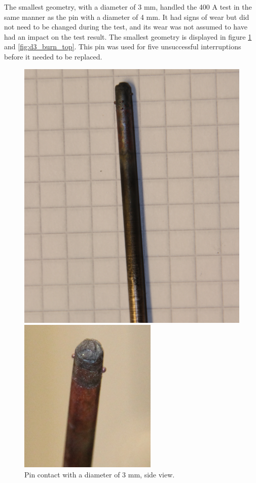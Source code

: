 \documentclass[10pt,a4paper,twoside]{article}
\begin{document}
The smallest geometry, with a diameter of 3 mm, handled the 400 A test in the same manner as the pin with a diameter of 4 mm. It had signs of wear but did not need to be changed during the test, and its wear was not assumed to have had an impact on the test result. The smallest geometry is displayed in figure \ref{fig:d3_burn_side} and \ref{fig:d3_burn_top}. This pin was used for five unsuccessful interruptions before it needed to be replaced.


\begin{figure}[H]
\centering
\begin{minipage}{.5\textwidth}
  \centering
  \includegraphics[scale=0.2]{Bilder/Discussion/d3_630_burn.png}
  \caption{Pin contact with a diameter of 3 mm, \newline side view.}
  \label{fig:d3_burn_side}
\end{minipage}%
\begin{minipage}{.5\textwidth}
  \centering
  \includegraphics[scale=0.61]{Bilder/Discussion/d3_630_top_burn.png}

\end{minipage}
\end{figure}
\end{document}
